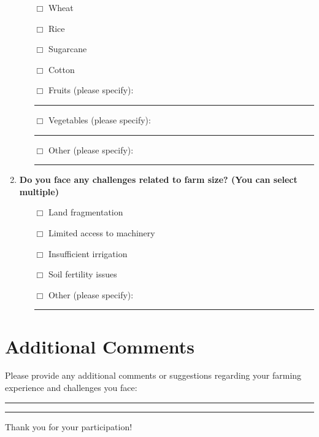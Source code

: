 \documentclass[12pt]{article}
\begin{document}
\begin{enumerate}[label=\arabic*.]
    \begin{itemize}
        \item [$\Box$] Wheat
        \item [$\Box$] Rice
        \item [$\Box$] Sugarcane
        \item [$\Box$] Cotton
        \item [$\Box$] Fruits (please specify): \rule{10cm}{0.4pt}
        \item [$\Box$] Vegetables (please specify): \rule{9.2cm}{0.4pt}
        \item [$\Box$] Other (please specify): \rule{10cm}{0.4pt}
    \end{itemize}
    \item \textbf{Do you face any challenges related to farm size? (You can select multiple)}
    \begin{itemize}
        \item [$\Box$] Land fragmentation
        \item [$\Box$] Limited access to machinery
        \item [$\Box$] Insufficient irrigation
        \item [$\Box$] Soil fertility issues
        \item [$\Box$] Other (please specify): \rule{10cm}{0.4pt}
    \end{itemize}
\end{enumerate}

\section*{Additional Comments}
Please provide any additional comments or suggestions regarding your farming experience and challenges you face:
\rule{10cm}{0.4pt}
\rule{16cm}{0.4pt}

Thank you for your participation!
\end{document}
